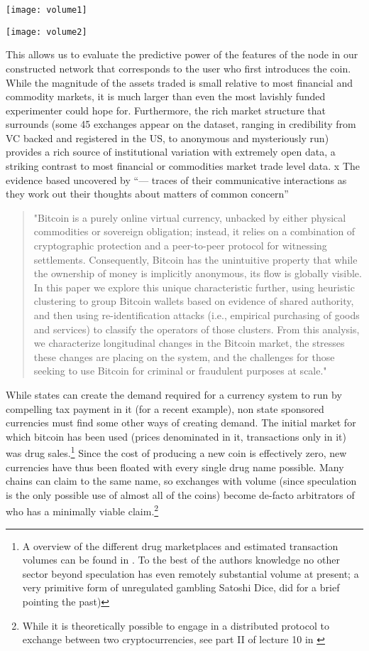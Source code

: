 \texttt{[image: volume1]}

\texttt{[image: volume2]}

This allows us to evaluate the predictive power of the features of the node in our constructed network that corresponds to the user who first introduces the coin. 
While the magnitude of the assets traded is small relative to most financial and commodity markets, it is much larger than even the most lavishly funded experimenter could hope for.
Furthermore, the rich market structure that surrounds (some 45 exchanges appear on the dataset, ranging in credibility from VC backed and registered in the US, to anonymous and mysteriously run) provides a rich source of institutional variation with extremely open data, a striking contrast to most financial or commodities market trade level data. 
x
The evidence based uncovered by “— traces of their communicative interactions as they work out their thoughts about matters of common concern” 

\begin{quote}
"Bitcoin is a purely online virtual currency, unbacked by either physical commodities or sovereign obligation; instead, it relies on a combination of cryptographic protection and a peer-to-peer protocol for witnessing settlements. Consequently, Bitcoin has the unintuitive property that while the ownership of money is implicitly anonymous, its flow is globally visible. In this paper we explore this unique characteristic further, using heuristic clustering to group Bitcoin wallets based on evidence of shared authority, and then using re-identification attacks (i.e., empirical purchasing of goods and services) to classify the operators of those clusters. From this analysis, we characterize longitudinal changes in the Bitcoin market, the stresses these changes are placing on the system, and the challenges for those seeking to use Bitcoin for criminal or fraudulent purposes at scale." 
\end{quote} 
\cite{meiklejohn2013fistful}

While states can create the demand required for a currency system to run by compelling tax payment in it (for a recent example), non state sponsored currencies must find some other ways of creating demand.
The initial market for which bitcoin has been used (prices denominated in it, transactions only in it) was drug sales.\footnote{A overview of the different drug marketplaces and estimated transaction volumes can be found in \cite{soska2015measuring}. To the best of the authors knowledge no other sector beyond speculation has even remotely substantial volume at present; a very primitive form of unregulated gambling Satoshi Dice, did for a brief pointing the past)   }
Since the cost of producing a new coin is effectively zero, new currencies have thus been floated with every single drug name possible. Many chains can claim to the same name, so exchanges with volume (since speculation is the only possible use of almost all of the coins) become de-facto arbitrators of who has a minimally viable claim.\footnote{While it is theoretically possible to engage in a distributed protocol to exchange between two cryptocurrencies, see part II of lecture 10 in \cite{princeton10}}






